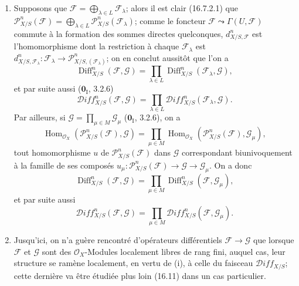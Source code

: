 \begin{remarks}[16.8.11]
\label{IV.16.8.11}
\begin{enumerate}
  \item[(i)] Supposons que
  $\mathscr{F}=\bigoplus_{\lambda\in L}\mathscr{F}_\lambda$; alors il est
  clair (16.7.2.1) que
  $\mathscr{P}_{X/S}^n(\mathscr{F})=
  \bigoplus_{\lambda\in L}\mathscr{P}_{X/S}^n(\mathscr{F}_\lambda)$; comme le
  foncteur $\mathscr{F}\leadsto\Gamma(U,\mathscr{F})$ commute à la formation
  des sommes directes quelconques, $d_{X/S,\mathscr{F}}^n$ est
  l'homomorphisme dont la restriction à chaque $\mathscr{F}_\lambda$ est
  $d_{X/S,\mathscr{F}_\lambda}^n:\mathscr{F}_\lambda\to\mathscr{P}_{X/S,(\mathscr{F}_\lambda)}^n$;
  on en conclut aussitôt que l'on a
  \[
    \operatorname{Diff}_{X/S}^n(\mathscr{F},\mathscr{G})
    =\prod_{\lambda\in L}
    \operatorname{Diff}_{X/S}^n(\mathscr{F}_\lambda,\mathscr{G}),
  \]
  et par suite aussi ($\mathbf{0}_{\mathrm I}$, 3.2.6)
  \[
    \mathscr{D}\!iff_{X/S}^n(\mathscr{F},\mathscr{G})
    =\prod_{\lambda\in L}
    \mathscr{D}\!iff_{X/S}^n(\mathscr{F}_\lambda,\mathscr{G}).
  \]
  Par ailleurs, si $\mathscr{G}=\prod_{\mu\in M}\mathscr{G}_\mu$
  ($\mathbf{0}_{\mathrm I}$, 3.2.6), on a
  \[
    \operatorname{Hom}_{\mathcal{O}_X}
    (\mathscr{P}_{X/S}^n(\mathscr{F}),\mathscr{G})
    =\prod_{\mu\in M}\operatorname{Hom}_{\mathcal{O}_X}
    (\mathscr{P}_{X/S}^n(\mathscr{F}),\mathscr{G}_\mu),
  \]
  tout homomorphisme $u$ de $\mathscr{P}_{X/S}^n(\mathscr{F})$ dans
  $\mathscr{G}$ correspondant biunivoquement à la famille de ses composés
  $u_\mu:\mathscr{P}_{X/S}^n(\mathscr{F})\to\mathscr{G}\to\mathscr{G}_\mu$.
  On a donc
  \[
    \operatorname{Diff}_{X/S}^n(\mathscr{F},\mathscr{G})
    =\prod_{\mu\in M}
    \operatorname{Diff}_{X/S}^n(\mathscr{F},\mathscr{G}_\mu),
  \]
  et par suite aussi
  \[
    \mathscr{D}\!iff_{X/S}^n(\mathscr{F},\mathscr{G})
    =\prod_{\mu\in M}
    \mathscr{D}\!iff_{X/S}^n(\mathscr{F},\mathscr{G}_\mu).
  \]
  \item[(ii)] Jusqu'ici, on n'a guère rencontré d'opérateurs différentiels
  $\mathscr{F}\to\mathscr{G}$ que lorsque $\mathscr{F}$ et $\mathscr{G}$ sont
  des $\mathcal{O}_X$-Modules localement libres de rang fini, auquel cas, leur
  structure se ramène localement, en vertu de (i), à celle du faisceau
  $\mathscr{D}\!iff_{X/S}$; cette dernière va être étudiée plus loin (16.11)
  dans un cas particulier.
\end{enumerate}
\end{remarks}

